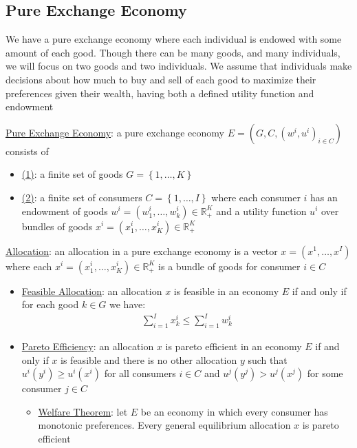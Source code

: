\documentclass{article}
\begin{document}
\subsection{Pure Exchange Economy}
We have a pure exchange economy where each individual is endowed with some amount of each good. Though there can be many goods, and many individuals, we will focus on two goods and two individuals. We assume that individuals make decisions about how much to buy and sell of each good to maximize their preferences given their wealth, having both a defined utility function and endowment
\par \vspace{0.3em}
  \underline{Pure Exchange Economy}: a pure exchange economy $E = (G,C,(w^{i},u^{i})_{i \in C})$ consists of
  \begin{itemize}
    \item  \underline{(1)}: a finite set of goods $G = \left\{ 1, \dots, K \right\}$
    \item  \underline{(2)}: a finite set of consumers $C = \left\{ 1, \dots, I \right\}$ where each consumer $i$ has an endowment of goods $w^{i} = (w_{1}^{i}, \dots, w_{k}^{i}) \in \mathbb{R}_{+}^{K}$ and a utility function $u^{i}$ over bundles of goods $x^{i} = (x_{1}^{i}, \dots, x_{K}^{i}) \in \mathbb{R}_{+}^{K}$
  \end{itemize}
  \par
  \underline{Allocation}: an allocation in a pure exchange economy is a vector $x = (x^{1}, \dots, x^{I})$ where each $x^{i} = (x_{1}^{i}, \dots, x_{K}^{i}) \in \mathbb{R}_{+}^{K}$ is a bundle of goods for consumer $i \in C$
  \begin{itemize}
    \item  \underline{Feasible Allocation}: an allocation $x$ is feasible in an economy $E$ if and only if for each good $k \in G$ we have:
    \begin{gather*}
      \sum_{i=1}^{I} x_{k}^{i} \leq \sum_{i=1}^{I} w_{k}^{i}
    \end{gather*}
    \item  \underline{Pareto Efficiency}: an allocation $x$ is pareto efficient in an economy $E$ if and only if $x$ is feasible and there is no other allocation $y$ such that $u^{i}(y^{i}) \geq u^{i}(x^{i})$ for all consumers $i \in C$ and $u^{j}(y^{j}) > u^{j}(x^{j})$ for some consumer $j \in C$
    \begin{itemize}
      \item  \underline{Welfare Theorem}: let $E$ be an economy in which every consumer has monotonic preferences. Every general equilibrium allocation $x$ is pareto efficient
    \end{itemize}
  \end{itemize}
\end{document}
